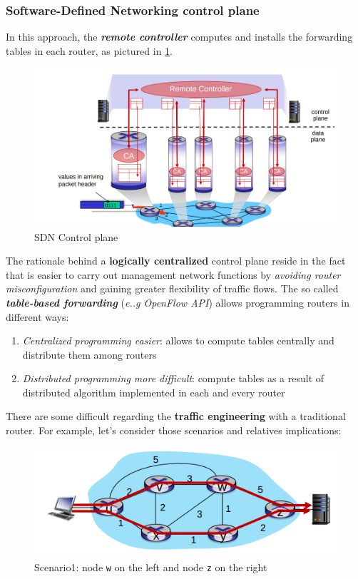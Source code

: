 \documentclass[10pt,a4paper]{report}
\theoremstyle{definition}
\begin{document}
\subsubsection{Software-Defined Networking control plane}\label{sec:software-defined-networking-control-plane}
In this approach, the \textit{\textbf{remote controller}} computes and installs the forwarding tables in each router, as pictured in \ref{sdn-image}.

\begin{figure}[h!]
	\centering\includegraphics[scale=0.50]{images/Pasted image 20230322105540.png}
	\caption{SDN Control plane}
\label{sdn-image}
\end{figure}


The rationale behind  a \textbf{logically centralized} control plane reside in the fact that is easier to carry out management network functions by \textit{avoiding router misconfiguration} and gaining greater flexibility of traffic flows.
The so called \textit{\textbf{table-based forwarding}} (\textit{e..g OpenFlow API}) allows programming routers in different ways:
\begin{enumerate}
	\item 
	\textit{Centralized programming easier}: allows to compute tables centrally and distribute them among routers
	\item 
	\textit{Distributed programming more difficult}: compute tables as a result of distributed algorithm implemented in each and every router
\end{enumerate}

There are some difficult regarding the \textbf{traffic engineering} with a traditional router. For example, let's consider those scenarios and relatives implications:
\begin{figure}[h]
	\centering\includegraphics[scale=0.50]{images/Pasted image 20230322110125.png}
	\caption{Scenario1: node \texttt{w} on the left and node \texttt{z} on the right}
\label{q1-diagram}
\end{figure}
\end{document}
